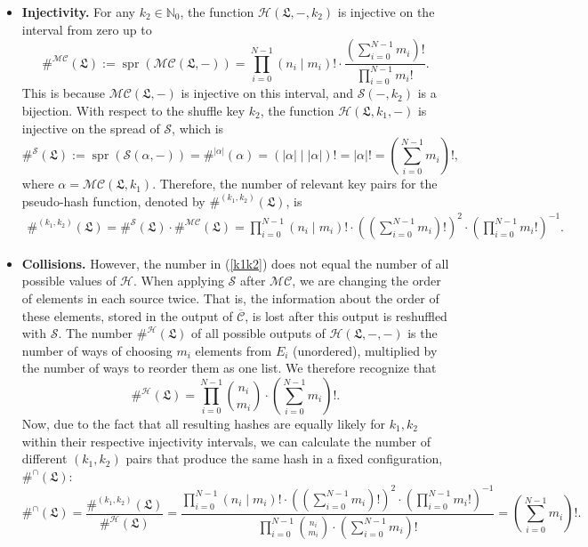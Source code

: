 \documentclass[a4paper, 10pt]{article}
\theoremstyle{plain}
\theoremstyle{definition}
\newcommand{\N}{\mathbb{N}}
\newcommand{\rf}[2]{(#1 \mathbin{\mid} #2)!}
\newcommand{\spr}[1]{\operatorname{spr}(#1)}
\newcommand{\conf}{\mathfrak{L}}
\newcommand{\elv}{\overline{\mathcal{C}}}
\newcommand{\mc}{\mathcal{MC}}
\newcommand{\h}{\mathcal{H}}
\newcommand{\s}{\mathcal{S}}
\begin{document}
\begin{itemize}
  \item \textbf{Injectivity.} For any $k_2 \in \N_0$, the function $\h(\conf, -, k_2)$ is injective on the interval from zero up to
    \[
      \#^\mc (\conf) := \spr{\mc(\conf, -)} = \prod_{i = 0}^{N-1} \rf{n_i}{m_i} \cdot \frac{\left( \sum_{i = 0}^{N-1} m_i \right)!}{\prod_{i = 0}^{N-1} m_i !}.
    \]
    This is because $\mc(\conf, -)$ is injective on this interval, and $\s(-, k_2)$ is a bijection. With respect to the shuffle key $k_2$, the function $\h(\conf, k_1, -)$ is injective on the spread of $\s$, which is
    \[
      \#^\s (\conf) := \spr{\s(\alpha, -)} = \#^{|\alpha|} (\alpha) = \rf{|\alpha|}{|\alpha|} = |\alpha|! = \left( \sum_{i = 0}^{N-1} m_i \right)!,
    \]
    where $\alpha = \mc(\conf, k_1)$. Therefore, the number of relevant key pairs for the pseudo-hash function, denoted by $\#^{(k_1, k_2)}(\conf)$, is
    \begin{align}
      \label{k1k2}
      \#^{(k_1,k_2)}(\conf) = \#^\s (\conf) \cdot \#^\mc (\conf) = \prod_{i=0}^{N-1} \rf{n_i}{m_i} \cdot \left( \left( \sum_{i=0}^{N-1} m_i \right)! \right)^2 \cdot \left( \prod_{i = 0}^{N-1} m_i ! \right)^{-1}.
    \end{align}
  \item \textbf{Collisions.}
    However, the number in (\ref{k1k2}) does not equal the number of all possible values of $\h$. When applying $\s$ after $\mc$, we are changing the order of elements in each source twice. That is, the information about the order of these elements, stored in the output of $\elv$, is lost after this output is reshuffled with $\s$. The number $\#^\h (\conf)$ of all possible outputs of $\h(\conf, -, -)$ is the number of ways of choosing $m_i$ elements from $E_i$ (unordered), multiplied by the number of ways to reorder them as one list. We therefore recognize that
    \[
      \#^\h (\conf) = \prod_{i=0}^{N-1} {n_i \choose{m_i}} \cdot \left( \sum_{i = 0}^{N-1} m_i \right)!.
    \]
    Now, due to the fact that all resulting hashes are equally likely for $k_1, k_2$ within their respective injectivity intervals, we can calculate the number of different $(k_1, k_2)$ pairs that produce the same hash in a fixed configuration, $\#^\cap (\conf)$:
    \[
      \#^\cap (\conf) = \frac{\#^{(k_1,k_2)}(\conf)}{\#^\h (\conf)} =
      \frac{\prod_{i=0}^{N-1} \rf{n_i}{m_i} \cdot \left( \left( \sum_{i=0}^{N-1} m_i \right)! \right)^2 \cdot \left( \prod_{i = 0}^{N-1} m_i ! \right)^{-1}}{\prod_{i=0}^{N-1} {n_i \choose{m_i}} \cdot \left( \sum_{i = 0}^{N-1} m_i \right)!} = \left( \sum_{i = 0}^{N-1} m_i \right)!.
    \]
\end{itemize}
\end{document}
